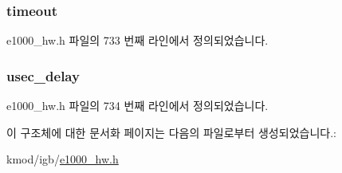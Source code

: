 \subsubsection[{\texorpdfstring{timeout}{timeout}}]{ timeout}\hypertarget{structe1000__mbx__info_aab0b8a4320e771becf663b000c2cd7e1}{}\label{structe1000__mbx__info_aab0b8a4320e771becf663b000c2cd7e1}


e1000\+\_\+hw.\+h 파일의 733 번째 라인에서 정의되었습니다.

\subsubsection[{\texorpdfstring{usec\+\_\+delay}{usec_delay}}]{ usec\+\_\+delay}\hypertarget{structe1000__mbx__info_af53e869635e722745867234d465ee235}{}\label{structe1000__mbx__info_af53e869635e722745867234d465ee235}


e1000\+\_\+hw.\+h 파일의 734 번째 라인에서 정의되었습니다.



이 구조체에 대한 문서화 페이지는 다음의 파일로부터 생성되었습니다.\+:\begin{DoxyCompactItemize}
\item 
kmod/igb/\hyperlink{kmod_2igb_2e1000__hw_8h}{e1000\+\_\+hw.\+h}\end{DoxyCompactItemize}
